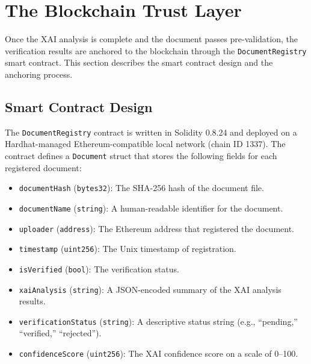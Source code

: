 \section{The Blockchain Trust Layer}
\label{sec:blockchain_layer}
    Once the XAI analysis is complete and the document passes pre-validation, the verification results are anchored to the blockchain through the \texttt{DocumentRegistry} smart contract. This section describes the smart contract design and the anchoring process.
    \subsection{Smart Contract Design}
    \label{sec:smart_contract}
        The \texttt{DocumentRegistry} contract is written in Solidity 0.8.24 and deployed on a Hardhat-managed Ethereum-compatible local network (chain ID 1337). The contract defines a \texttt{Document} struct that stores the following fields for each registered document:
        
        \begin{itemize}
            \item \texttt{documentHash} (\texttt{bytes32}): The SHA-256 hash of the document file.
        
            \item \texttt{documentName} (\texttt{string}): A human-readable identifier for the document.
        
            \item \texttt{uploader} (\texttt{address}): The Ethereum address that registered the document.
        
            \item \texttt{timestamp} (\texttt{uint256}): The Unix timestamp of registration.
        
            \item \texttt{isVerified} (\texttt{bool}): The verification status.
        
            \item \texttt{xaiAnalysis} (\texttt{string}): A JSON-encoded summary of the XAI analysis results.
        
            \item \texttt{verificationStatus} (\texttt{string}): A descriptive status string (e.g., ``pending,'' ``verified,'' ``rejected'').
        
            \item \texttt{confidenceScore} (\texttt{uint256}): The XAI confidence score on a scale of 0--100.
        \end{itemize}
        
